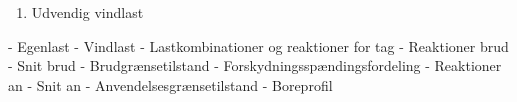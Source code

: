 \chapter{}

\begin{enumerate}
	\item Udvendig vindlast
\end{enumerate}


- Egenlast
- Vindlast
- Lastkombinationer og reaktioner for tag
- Reaktioner brud
- Snit brud
- Brudgrænsetilstand
- Forskydningsspændingsfordeling
- Reaktioner an
- Snit an
- Anvendelsesgrænsetilstand
- Boreprofil